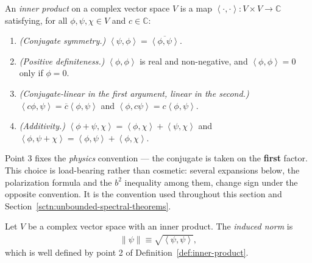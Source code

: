\begin{definition}
    \label{def:inner-product}
    \leanok
    An \textit{inner product} on a complex vector space $V$ is a map $\left< \cdot, \cdot \right> : V \times V \rightarrow \mathbb{C}$ satisfying, for all $\phi, \psi, \chi \in V$ and $c \in \mathbb{C}$:
    \begin{enumerate}
        \item \textit{(Conjugate symmetry.)} $\left< \psi, \phi \right> = \overline{\left< \phi, \psi \right>}$.
        \item \textit{(Positive definiteness.)} $\left< \phi, \phi \right>$ is real and non-negative, and $\left< \phi, \phi \right> = 0$ only if $\phi = 0$.
        \item \textit{(Conjugate-linear in the first argument, linear in the second.)} $\left< c\phi, \psi \right> = \overline{c} \left< \phi, \psi \right>$ and $\left< \phi, c\psi \right> = c \left< \phi, \psi \right>$.
        \item \textit{(Additivity.)} $\left< \phi + \psi, \chi \right> = \left< \phi, \chi \right> + \left< \psi, \chi \right>$ and $\left< \phi, \psi + \chi \right> = \left< \phi, \psi \right> + \left< \phi, \chi \right>$.
    \end{enumerate}
    Point 3 fixes the \textit{physics} convention — the conjugate is taken on the \textbf{first} factor. This choice is load-bearing rather than cosmetic: several expansions below, the polarization formula and the $b^2$ inequality among them, change sign under the opposite convention. It is the convention used throughout this section and Section~\ref{sctn:unbounded-spectral-theorems}.
\end{definition}

\begin{definition}
    \label{def:induced-norm}
    \leanok
    Let $V$ be a complex vector space with an inner product. The \textit{induced norm} is
    \begin{align}
        \left\| \psi \right\| \equiv \sqrt{\left< \psi, \psi \right>},
    \end{align}
    which is well defined by point 2 of Definition~\ref{def:inner-product}.
\end{definition}

